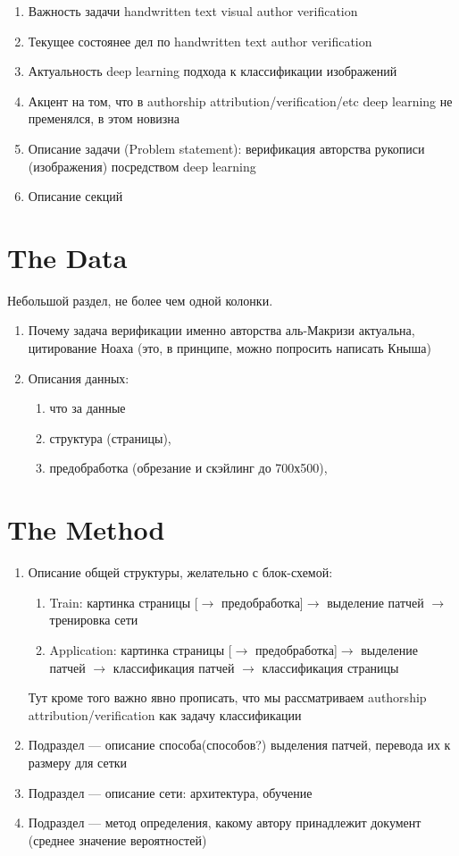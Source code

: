 \documentclass[conference,a4paper,twocolumn]{IEEEtran}
\begin{document}
\begin{enumerate}
	\item Важность задачи handwritten text visual author verification
	\item Текущее состоянее дел по handwritten text author verification
	\item Актуальность deep learning подхода к классификации изображений
	\item Акцент на том, что в authorship attribution/verification/etc deep learning не пременялся, в этом новизна
	\item Описание задачи (Problem statement): верификация авторства рукописи (изображения) посредством deep learning
	\item Описание секций
\end{enumerate}

\section{The Data}
Небольшой раздел, не более чем одной колонки.
\begin{enumerate}
	\item Почему задача верификации именно авторства аль-Макризи актуальна, цитирование Ноаха (это, в принципе, можно попросить написать Кныша)
	\item Описания данных: 
	\begin{enumerate}
		\item что за данные
		\item структура (страницы), 
		\item предобработка (обрезание и скэйлинг до 700х500), 
	\end{enumerate}
\end{enumerate}


\section{The Method}
\begin{enumerate}
	\item Описание общей структуры, желательно с блок-схемой: 
		\begin{enumerate}
			 \item Train: картинка страницы [$\to$  предобработка]$\to$ выделение патчей $\to$ тренировка сети
			 \item Application: картинка страницы [$\to$  предобработка]$\to$ выделение патчей $\to$ классификация патчей $\to$ классификация страницы
		\end{enumerate}
	Тут кроме того важно явно прописать, что мы рассматриваем authorship attribution/verification как задачу классификации
	\item Подраздел --- описание способа(способов?) выделения патчей, перевода их к размеру для сетки
	\item Подраздел --- описание сети: архитектура, обучение
	\item Подраздел --- метод определения, какому автору принадлежит документ (среднее значение вероятностей)
\end{enumerate}
\end{document}
